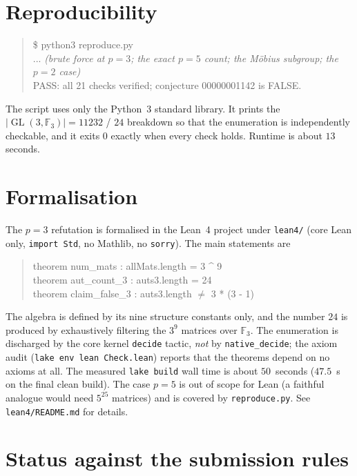 \documentclass[11pt]{article}
\theoremstyle{definition}
\theoremstyle{remark}
\newcommand{\GL}{\operatorname{GL}}
\begin{document}
\section{Reproducibility}

\begin{quote}\ttfamily
\$ python3 reproduce.py\\
... \textit{(brute force at $p=3$; the exact $p=5$ count; the Möbius subgroup;
the $p=2$ case)}\\
PASS: all 21 checks verified; conjecture 00000001142 is FALSE.
\end{quote}

The script uses only the Python~3 standard library. It prints the
$|\GL(3,\mathbb{F}_3)| = 11232$ / $24$ breakdown so that the enumeration is
independently checkable, and it exits $0$ exactly when every check holds.
Runtime is about $13$ seconds.

\section{Formalisation}

The $p=3$ refutation is formalised in the Lean~4 project under \texttt{lean4/}
(core Lean only, \texttt{import Std}, no Mathlib, no \texttt{sorry}). The main
statements are
\begin{quote}\ttfamily
theorem num\_mats : allMats.length = 3 \^{} 9\\
theorem aut\_count\_3 : auts3.length = 24\\
theorem claim\_false\_3 : auts3.length \(\neq\) 3 * (3 - 1)
\end{quote}
The algebra is defined by its nine structure constants only, and the number
$24$ is produced by exhaustively filtering the $3^9$ matrices over
$\mathbb{F}_3$. The enumeration is discharged by the core kernel
\texttt{decide} tactic, \emph{not} by \texttt{native\_decide}; the axiom audit
(\texttt{lake env lean Check.lean}) reports that the theorems depend on no
axioms at all. The measured \texttt{lake build} wall time is about $50$~seconds
($47.5$~s on the final clean build).
The case $p=5$ is out of scope for Lean (a faithful analogue would need
$5^{25}$ matrices) and is covered by \texttt{reproduce.py}. See
\texttt{lean4/README.md} for details.

\section*{Status against the submission rules}
\end{document}
